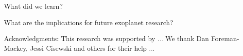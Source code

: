 \documentclass{aastex6}
\begin{document}
What did we learn?

What are the implications for future exoplanet research?

Acknowledgments: This research was supported by ... We thank
Dan Foreman-Mackey, Jessi Cisewski and others for their help ...

\begin{thebibliography}{99} 



\end{thebibliography}


\clearpage


\end{document}
